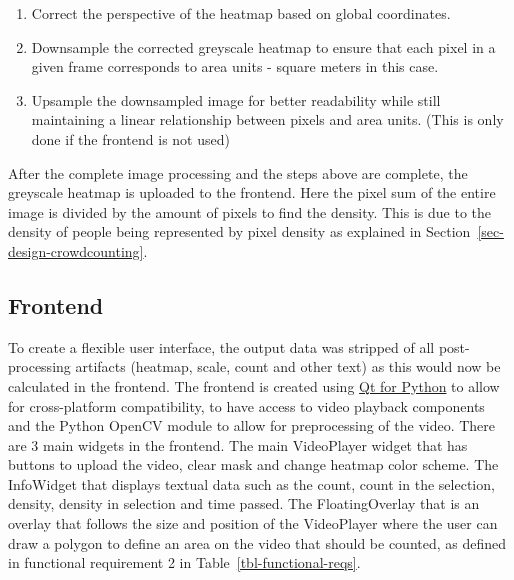 \documentclass[
]{article}
\providecommand{\tightlist}{%
  \setlength{\itemsep}{0pt}\setlength{\parskip}{0pt}}\usepackage{longtable,booktabs,array}
\begin{document}
\begin{enumerate}
\def\labelenumi{\arabic{enumi}.}
\tightlist
\item
  Correct the perspective of the heatmap based on global coordinates.
\item
  Downsample the corrected greyscale heatmap to ensure that each pixel
  in a given frame corresponds to area units - square meters in this
  case.
\item
  Upsample the downsampled image for better readability while still
  maintaining a linear relationship between pixels and area units. (This
  is only done if the frontend is not used)
\end{enumerate}

After the complete image processing and the steps above are complete,
the greyscale heatmap is uploaded to the frontend. Here the pixel sum of
the entire image is divided by the amount of pixels to find the density.
This is due to the density of people being represented by pixel density
as explained in Section~\ref{sec-design-crowdcounting}.

\newpage{}

\hypertarget{frontend}{%
\subsection{Frontend}\label{frontend}}

To create a flexible user interface, the output data was stripped of all
post-processing artifacts (heatmap, scale, count and other text) as this
would now be calculated in the frontend. The frontend is created using
\href{https://wiki.qt.io/Qt_for_Python}{Qt for Python} to allow for
cross-platform compatibility, to have access to video playback
components and the Python OpenCV module to allow for preprocessing of
the video. There are 3 main widgets in the frontend. The main
VideoPlayer widget that has buttons to upload the video, clear mask and
change heatmap color scheme. The InfoWidget that displays textual data
such as the count, count in the selection, density, density in selection
and time passed. The FloatingOverlay that is an overlay that follows the
size and position of the VideoPlayer where the user can draw a polygon
to define an area on the video that should be counted, as defined in
functional requirement 2 in Table~\ref{tbl-functional-reqs}.
\end{document}
